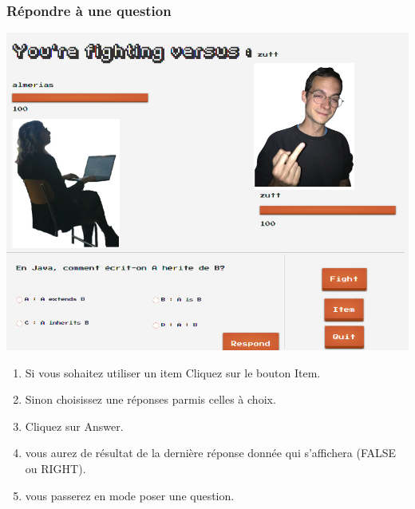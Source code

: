 \documentclass[a4paper,10pt]{report}
\begin{document}
\subsubsection{Répondre à une question}
\includegraphics[scale=0.3]{images/repondre.png}
\begin{enumerate}
 \item Si vous sohaitez utiliser un item Cliquez sur le bouton Item.
 \item Sinon choisissez une réponses parmis celles à choix.
 \item Cliquez sur Answer.
 \item vous aurez de résultat de la dernière réponse donnée qui s'affichera (FALSE ou RIGHT).
 \item vous passerez en mode poser une question.
\end{enumerate}
\end{document}
